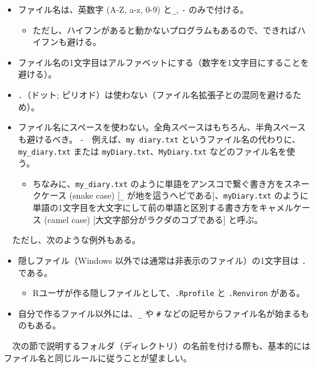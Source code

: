 \documentclass[
  a4paper,
  pandoc,
  ja=standard,
  jafont=haranoaji]{bxjsbook}
\providecommand{\tightlist}{%
  \setlength{\itemsep}{0pt}\setlength{\parskip}{0pt}}
\begin{document}
\begin{itemize}
\tightlist
\item
  ファイル名は、英数字 (A-Z, a-z, 0-9) と\texttt{\_}, \texttt{-}
  のみで付ける。

  \begin{itemize}
  \tightlist
  \item
    ただし、ハイフンがあると動かないプログラムもあるので、できればハイフンも避ける。
  \end{itemize}
\item
  ファイル名の1文字目はアルファベットにする（数字を1文字目にすることを避ける）。
\item
  \texttt{.}（ドット;
  ピリオド）は使わない（ファイル名拡張子との混同を避けるため）。
\item
  ファイル名にスペースを使わない。全角スペースはもちろん、半角スペースも避けるべき。
  -　例えば、\texttt{my\ diary.txt}
  というファイル名の代わりに、\texttt{my\_diary.txt} または
  \texttt{myDiary.txt}、\texttt{MyDiary.txt} などのファイル名を使う。

  \begin{itemize}
  \tightlist
  \item
    ちなみに、\texttt{my\_diary.txt}
    のように単語をアンスコで繋ぐ書き方をスネークケース (snake case)
    {[}\texttt{\_} が地を這うヘビである{]}、\texttt{myDiary.txt}
    のように単語の1文字目を大文字にして前の単語と区別する書き方をキャメルケース
    (camel case) {[}大文字部分がラクダのコブである{]} と呼ぶ。
  \end{itemize}
\end{itemize}

　ただし、次のような例外もある。

\begin{itemize}
\tightlist
\item
  隠しファイル（Windows 以外では通常は非表示のファイル）の1文字目は
  \texttt{.} である。

  \begin{itemize}
  \tightlist
  \item
    Rユーザが作る隠しファイルとして、\texttt{.Rprofile} と
    \texttt{.Renviron} がある。
  \end{itemize}
\item
  自分で作るファイル以外には、\texttt{\_} や \texttt{\#}
  などの記号からファイル名が始まるものもある。
\end{itemize}

　次の節で説明するフォルダ（ディレクトリ）の名前を付ける際も、基本的にはファイル名と同じルールに従うことが望ましい。
\end{document}

